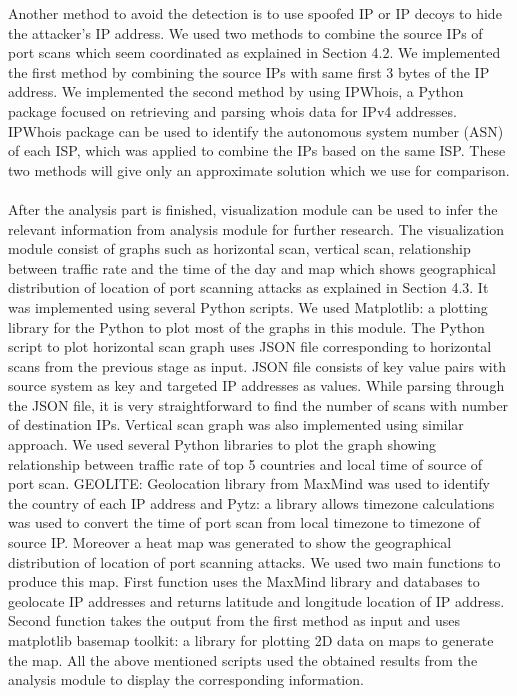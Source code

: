 Another method to avoid the detection is to use spoofed IP or IP decoys to hide the attacker's IP address.
We used two methods to combine the source IPs of port scans which seem coordinated as explained in Section 4.2.
We implemented the first method by combining the source IPs  with same first 3 bytes of the IP address. 
We implemented the second method by using IPWhois, a Python package focused on retrieving and parsing whois data for IPv4 addresses.
IPWhois package can be used to identify the autonomous system number (ASN) of each ISP, which was applied to combine the IPs based on the same ISP.
These two methods will give only an approximate solution which we use for comparison.\\\\
After the analysis part is finished, visualization module can be used to infer the relevant information from analysis module for further research.
The visualization module consist of graphs such as horizontal scan, vertical scan,  relationship between traffic rate and the time of the day and map which shows  geographical distribution of location of port scanning attacks as explained in Section 4.3.
It was implemented using several Python scripts.
We used Matplotlib: a plotting library for the Python to plot most of the graphs in this module.
The Python script to plot horizontal scan graph uses JSON file corresponding to horizontal scans from the previous stage as input.
JSON file consists of key value pairs with source system as key and targeted IP addresses as values.
While parsing through the JSON file, it is very straightforward to find the number of scans with number of destination IPs.
Vertical scan graph was also implemented using similar approach. 
We used several Python libraries to plot the graph showing relationship between  traffic rate of top 5 countries and local time of source of port scan.
GEOLITE: Geolocation library from MaxMind was used to identify the country of each IP address and Pytz: a library allows timezone calculations was used to convert the time of port scan from local timezone to timezone of source IP.
Moreover a heat map was generated to show the geographical distribution of location of port scanning attacks.
We used two main functions to produce this map.
First function uses the MaxMind library and databases to geolocate IP addresses and returns latitude and longitude location of IP address.
Second function takes the output from the first method as input and uses matplotlib basemap toolkit: a library for plotting 2D data on maps to generate the map.  
All the above mentioned scripts used the obtained results from the analysis module to display the corresponding information.
